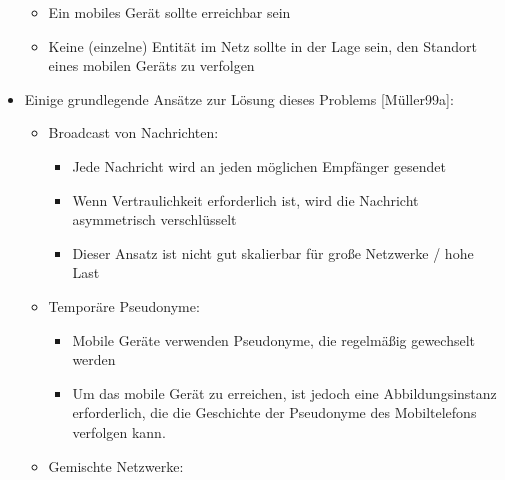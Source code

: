 \documentclass[a4paper]{article}
\begin{document}
\begin{multicols}{3}
\begin{itemize}
              \begin{itemize}
                  \item
                        Ein mobiles Gerät sollte erreichbar sein
                  \item
                        Keine (einzelne) Entität im Netz sollte in der Lage sein, den
                        Standort eines mobilen Geräts zu verfolgen
              \end{itemize}
        \item
              Einige grundlegende Ansätze zur Lösung dieses Problems
              {[}Müller99a{]}:

              \begin{itemize}
                  \item
                        Broadcast von Nachrichten:

                        \begin{itemize}
                            \item
                                  Jede Nachricht wird an jeden möglichen Empfänger gesendet
                            \item
                                  Wenn Vertraulichkeit erforderlich ist, wird die Nachricht
                                  asymmetrisch verschlüsselt
                            \item
                                  Dieser Ansatz ist nicht gut skalierbar für große Netzwerke / hohe
                                  Last
                        \end{itemize}
                  \item
                        Temporäre Pseudonyme:

                        \begin{itemize}
                            \item
                                  Mobile Geräte verwenden Pseudonyme, die regelmäßig gewechselt
                                  werden
                            \item
                                  Um das mobile Gerät zu erreichen, ist jedoch eine
                                  Abbildungsinstanz erforderlich, die die Geschichte der Pseudonyme
                                  des Mobiltelefons verfolgen kann.
                        \end{itemize}
                  \item
                        Gemischte Netzwerke:


\end{itemize}
\end{itemize}
\end{multicols}
\end{document}
